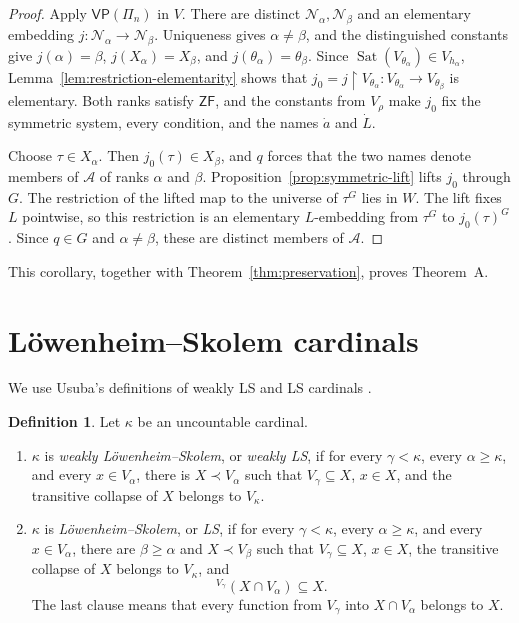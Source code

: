 \documentclass[11pt,a4paper]{amsart}
\newcommand{\VP}{\mathsf{VP}}
\newcommand{\ZF}{\mathsf{ZF}}
\newcommand{\restr}{\mathbin{\upharpoonright}}
\theoremstyle{plain}
\theoremstyle{definition}
\newtheorem{definition}[theorem]{Definition}
\theoremstyle{remark}
\begin{document}
\begin{proof}
Apply $\VP(\Pi_n)$ in $V$.  There are distinct $\mathcal N_\alpha,\mathcal N_\beta$ and an elementary embedding $j:\mathcal N_\alpha\to\mathcal N_\beta$.  Uniqueness gives $\alpha\ne\beta$, and the distinguished constants give $j(\alpha)=\beta$, $j(X_\alpha)=X_\beta$, and $j(\theta_\alpha)=\theta_\beta$.  {Since $\operatorname{Sat}(V_{\theta_\alpha})\in V_{h_\alpha}$, Lemma~\ref{lem:restriction-elementarity} shows that $j_0=j\restr V_{\theta_\alpha}:V_{\theta_\alpha}\longrightarrow V_{\theta_\beta}$ is elementary.}  Both ranks satisfy $\ZF$, and the constants from $V_\rho$ make $j_0$ fix the symmetric system, every condition, and the names $\dot a$ and $\dot L$.

{Choose $\tau\in X_\alpha$.}  Then $j_0(\tau)\in X_\beta$, and $q$ forces that the two names denote members of $\mathcal A$ of ranks $\alpha$ and $\beta$.  Proposition~\ref{prop:symmetric-lift} lifts $j_0$ through $G$.  The restriction of the lifted map to the universe of $\tau^G$ lies in $W$.  {The lift fixes $L$ pointwise, so this restriction is an elementary $L$-embedding from $\tau^G$ to $j_0(\tau)^G$.}  Since $q\in G$ and $\alpha\ne\beta$, these are distinct members of $\mathcal A$.
\end{proof}

This corollary, together with Theorem~\ref{thm:preservation}, proves Theorem~A.

\endgroup

\begingroup

\section{L\"owenheim--Skolem cardinals}\label{sec:LS}

We use Usuba's definitions of weakly LS and LS cardinals \cite[Definition~1.1]{Usuba}.

\begin{definition}\label{def:LS}
Let $\kappa$ be an uncountable cardinal.
\begin{enumerate}
\item $\kappa$ is \emph{weakly L\"owenheim--Skolem}, or \emph{weakly LS}, if for every $\gamma<\kappa$, every $\alpha\geq\kappa$, and every $x\in V_\alpha$, there is $X\prec V_\alpha$ such that $V_\gamma\subseteq X$, $x\in X$, and the transitive collapse of $X$ belongs to $V_\kappa$.
\item $\kappa$ is \emph{L\"owenheim--Skolem}, or \emph{LS}, if for every $\gamma<\kappa$, every $\alpha\geq\kappa$, and every $x\in V_\alpha$, there are $\beta\geq\alpha$ and $X\prec V_\beta$ such that $V_\gamma\subseteq X$, $x\in X$, the transitive collapse of $X$ belongs to $V_\kappa$, and
\[
{}^{V_\gamma}(X\cap V_\alpha)\subseteq X.
\]
The last clause means that every function from $V_\gamma$ into $X\cap V_\alpha$ belongs to $X$.
\end{enumerate}
\end{definition}
\end{document}
